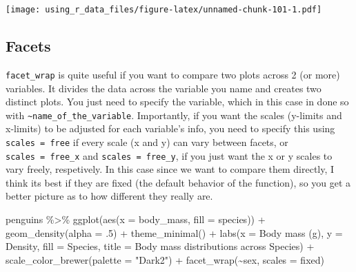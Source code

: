 \documentclass[
]{book}
\newenvironment{Shaded}{\begin{snugshade}}{\end{snugshade}}
\newcommand{\AttributeTok}[1]{\textcolor[rgb]{0.77,0.63,0.00}{#1}}
\newcommand{\DecValTok}[1]{\textcolor[rgb]{0.00,0.00,0.81}{#1}}
\newcommand{\FunctionTok}[1]{\textcolor[rgb]{0.00,0.00,0.00}{#1}}
\newcommand{\NormalTok}[1]{#1}
\newcommand{\SpecialCharTok}[1]{\textcolor[rgb]{0.00,0.00,0.00}{#1}}
\newcommand{\StringTok}[1]{\textcolor[rgb]{0.31,0.60,0.02}{#1}}
\begin{document}
\texttt{[image: using\_r\_data\_files/figure-latex/unnamed-chunk-101-1.pdf]}

\hypertarget{facets}{%
\subsection{Facets}\label{facets}}

\texttt{facet\_wrap} is quite useful if you want to compare two plots across 2 (or more) variables.
It divides the data across the variable you name and creates two distinct plots.
You just need to specify the variable, which in this case in done so with \texttt{\textasciitilde{}name\_of\_the\_variable}.
Importantly, if you want the scales (y-limits and x-limits) to be adjusted for each variable's info, you need to specify this using \texttt{scales\ =\ \textquotesingle{}free\textquotesingle{}} if every scale (x and y) can vary between facets, or \texttt{scales\ =\ \textquotesingle{}free\_x\textquotesingle{}} and \texttt{scales\ =\ \textquotesingle{}free\_y\textquotesingle{}}, if you just want the x or y scales to vary freely, respetively.
In this case since we want to compare them directly, I think its best if they are fixed (the default behavior of the function), so you get a better picture as to how different they really are.

\begin{Shaded}
\begin{Highlighting}[]
\NormalTok{penguins }\SpecialCharTok{\%\textgreater{}\%} 
  \FunctionTok{ggplot}\NormalTok{(}\FunctionTok{aes}\NormalTok{(}\AttributeTok{x =}\NormalTok{ body\_mass, }\AttributeTok{fill =}\NormalTok{ species)) }\SpecialCharTok{+} 
  \FunctionTok{geom\_density}\NormalTok{(}\AttributeTok{alpha =}\NormalTok{ .}\DecValTok{5}\NormalTok{) }\SpecialCharTok{+}
  \FunctionTok{theme\_minimal}\NormalTok{() }\SpecialCharTok{+}
  \FunctionTok{labs}\NormalTok{(}\AttributeTok{x =} \StringTok{\textquotesingle{}Body mass (g)\textquotesingle{}}\NormalTok{, }\AttributeTok{y =} \StringTok{\textquotesingle{}Density\textquotesingle{}}\NormalTok{,}
       \AttributeTok{fill =} \StringTok{\textquotesingle{}Species\textquotesingle{}}\NormalTok{, }
       \AttributeTok{title =} \StringTok{\textquotesingle{}Body mass distributions across Species\textquotesingle{}}\NormalTok{) }\SpecialCharTok{+}
  \FunctionTok{scale\_color\_brewer}\NormalTok{(}\AttributeTok{palette =} \StringTok{"Dark2"}\NormalTok{) }\SpecialCharTok{+}
  \FunctionTok{facet\_wrap}\NormalTok{(}\SpecialCharTok{\textasciitilde{}}\NormalTok{sex, }\AttributeTok{scales =} \StringTok{\textquotesingle{}fixed\textquotesingle{}}\NormalTok{)}
\end{Highlighting}
\end{Shaded}
\end{document}
